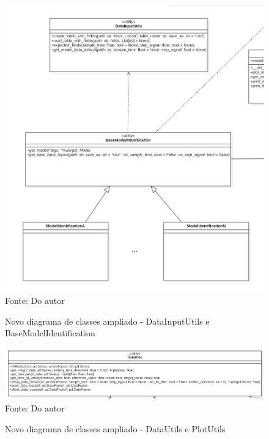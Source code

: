 \begin{figure}[H]
    \centering
    \caption{Novo diagrama de classes ampliado - DataInputUtils e BaseModelIdentification}
    \includegraphics[scale=0.35]{figuras/class_diag_diubmi_new}
    \label{fig:class_diag_diubmi_new}
    \\
    \vspace{0cm}\hspace{0cm}\small{Fonte: Do autor}
\end{figure}

\begin{figure}[H]
    \centering
    \caption{Novo diagrama de classes ampliado - DataUtils e PlotUtils}
    \includegraphics[scale=0.35]{figuras/class_diag_du_new}
    \label{fig:class_diag_du_new}
    \\
    \vspace{0cm}\hspace{0cm}\small{Fonte: Do autor}
\end{figure}

